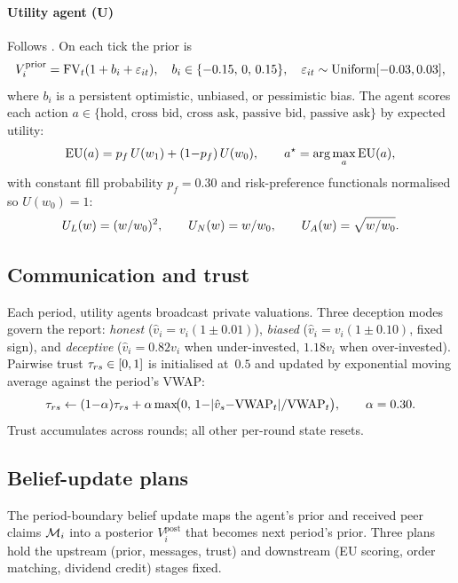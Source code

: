 \paragraph{Utility agent (U)}
Follows \citet{lopezlira2025llm}.  On each tick the prior is
\begin{equation}
V_i^{\text{prior}} = \mathrm{FV}_t(1+b_i+\varepsilon_{it}),
\quad
b_i\in\{-0.15,\,0,\,0.15\},
\quad
\varepsilon_{it}\sim\text{Uniform}[-0.03,0.03],
\label{eq:util-prior}
\end{equation}
where $b_i$ is a persistent optimistic, unbiased, or pessimistic bias.
The agent scores each action $a\in\{\text{hold, cross bid, cross ask,
passive bid, passive ask}\}$ by expected utility:
\begin{equation}
\mathrm{EU}(a) = p_f\,U(w_1) + (1{-}p_f)\,U(w_0),
\qquad
a^\star = \arg\max_a\mathrm{EU}(a),
\label{eq:eu}
\end{equation}
with constant fill probability $p_f{=}0.30$ and risk-preference
functionals normalised so $U(w_0){=}1$:
\begin{equation}
U_{L}(w) = (w/w_0)^2,\qquad
U_{N}(w) = w/w_0,\qquad
U_{A}(w) = \sqrt{w/w_0}.
\label{eq:risk}
\end{equation}

\subsection{Communication and trust}

Each period, utility agents broadcast private valuations.  Three
deception modes govern the report: \emph{honest}
($\hat v_i = v_i(1{\pm}0.01)$), \emph{biased}
($\hat v_i = v_i(1{\pm}0.10)$, fixed sign), and \emph{deceptive}
($\hat v_i = 0.82v_i$ when under-invested, $1.18v_i$ when
over-invested).  Pairwise trust $\tau_{rs}\in[0,1]$ is initialised
at~$0.5$ and updated by exponential moving average against the
period's VWAP:
\begin{equation}
\tau_{rs} \leftarrow
(1{-}\alpha)\tau_{rs}
+ \alpha\max\!\bigl(0,\,1{-}|\hat v_s{-}\mathrm{VWAP}_t|/\mathrm{VWAP}_t\bigr),
\qquad \alpha=0.30.
\label{eq:trust}
\end{equation}
Trust accumulates across rounds; all other per-round state resets.

\subsection{Belief-update plans}

The period-boundary belief update maps the agent's prior and received
peer claims $\mathcal{M}_i$ into a posterior $V_i^{\text{post}}$ that
becomes next period's prior.  Three plans hold the upstream (prior,
messages, trust) and downstream (EU scoring, order matching, dividend
credit) stages fixed.

